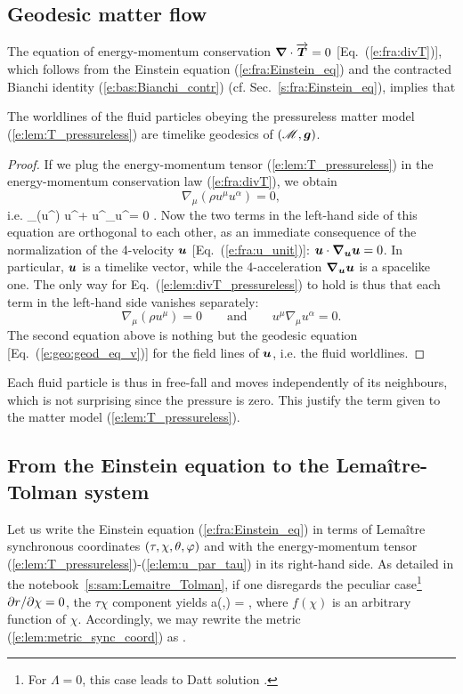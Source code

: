 \subsection{Geodesic matter flow}

The equation of energy-momentum conservation $\bm{\nabla}\cdot\overrightarrow{\bm{T}} = 0$
[Eq.~(\ref{e:fra:divT})], which
follows from the Einstein equation (\ref{e:fra:Einstein_eq}) and the contracted
Bianchi identity (\ref{e:bas:Bianchi_contr}) (cf. Sec.~\ref{s:fra:Einstein_eq}),
implies that
\begin{greybox}
The worldlines of the fluid particles obeying the pressureless matter
model (\ref{e:lem:T_pressureless}) are timelike geodesics of
$(\mathscr{M},\bm{g})$.
\end{greybox}
\begin{proof}
If we plug the energy-momentum tensor (\ref{e:lem:T_pressureless}) in the
energy-momentum conservation law (\ref{e:fra:divT}), we obtain
\[
    \nabla_\mu (\rho u^\mu u^\alpha )  = 0 ,
\]
i.e.
\be \label{e:lem:divT_pressureless}
    \nabla_\mu (\rho u^\mu) u^\alpha + \rho u^\mu \nabla_\mu u^\alpha = 0 .
\ee
Now the two terms in the left-hand side of this equation are orthogonal
to each other, as an immediate consequence of the normalization of the
4-velocity $\bm{u}$ [Eq.~(\ref{e:fra:u_unit})]:
$\bm{u}\cdot \bm{\nabla}_{\bm{u}}\bm{u} = 0$. In particular, $\bm{u}$
is a timelike vector, while the 4-acceleration $\bm{\nabla}_{\bm{u}}\bm{u}$
is a spacelike one. The only way for Eq.~(\ref{e:lem:divT_pressureless})
to hold is thus that each term
in the left-hand side vanishes separately:
\[
    \nabla_\mu (\rho u^\mu) = 0 \qquad\mbox{and}\qquad u^\mu \nabla_\mu u^\alpha = 0 .
\]
The second equation above is nothing but the geodesic equation [Eq.~(\ref{e:geo:geod_eq_v})]
for the field lines of $\bm{u}$, i.e. the fluid worldlines.
\end{proof}
Each fluid particle is thus in free-fall and moves independently of its
neighbours, which is not surprising since the pressure is zero.
This justify the term  given to the matter
model (\ref{e:lem:T_pressureless}).

\subsection{From the Einstein equation to the Lemaître-Tolman system}

Let us write the Einstein equation (\ref{e:fra:Einstein_eq})
in terms of Lemaître synchronous coordinates $(\tau,\chi,\theta,\varphi)$
and with the energy-momentum tensor (\ref{e:lem:T_pressureless})-(\ref{e:lem:u_par_tau})
in its right-hand side.
As detailed in the notebook~\ref{s:sam:Lemaitre_Tolman},
if one disregards the peculiar case\footnote{For $\Lambda=0$, this case leads to
Datt solution \cite{Datt38}.} ${\partial r}/{\partial \chi} = 0$,
the $\tau\chi$ component yields
\be \label{e:lem:a_f_dr}
    a(\tau,\chi) =   ,
\ee
where $f(\chi)$ is an arbitrary function of $\chi$.
Accordingly, we may rewrite the metric (\ref{e:lem:metric_sync_coord}) as
\be \label{e:lem:metric_Lemaitre}
     .
\ee


